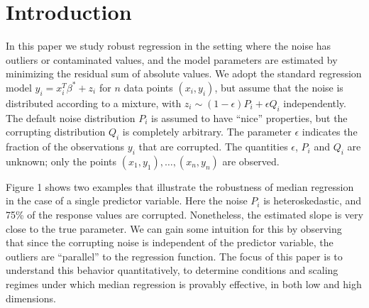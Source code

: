 
\section{Introduction}
\label{sec:intro}

In this paper we study robust regression in the setting where the noise has outliers or contaminated values,
and the model parameters are estimated by minimizing the residual sum of absolute values. We adopt the standard regression model $y_i=x_i^T\beta^*+z_i$ for $n$ data points $(x_i,y_i)$, but assume that the noise is distributed according to a mixture, with $z_i\sim (1-\epsilon)P_i+\epsilon Q_i$ independently. The default noise distribution $P_i$ is assumed to have ``nice'' properties, but the corrupting distribution
$Q_i$ is completely arbitrary. The parameter $\epsilon$ indicates the fraction of the observations $y_i$ that are corrupted. The quantities $\epsilon$, $P_i$ and $Q_i$ are unknown; only the points $(x_1, y_1), \ldots, (x_n, y_n)$ are observed.


Figure 1 shows two examples that illustrate the robustness of median regression
in the case of a single predictor variable. Here the noise $P_i$ is heteroskedastic, and 75\% of the response values are corrupted. Nonetheless, the estimated slope is very close to the true parameter. We can gain some intuition for this by observing that since the corrupting noise is independent of the predictor variable, the outliers are ``parallel'' to the regression function. The focus of this paper is to understand this behavior quantitatively, to determine conditions and scaling regimes under which median regression is provably effective, in both low and high dimensions.

